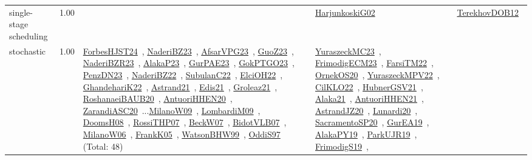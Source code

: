 {\begin{longtable}{p{3cm}r>{\raggedright\arraybackslash}p{6cm}>{\raggedright\arraybackslash}p{6cm}>{\raggedright\arraybackslash}p{8cm}}
\index{single-stage scheduling}\index{Concepts!single-stage scheduling}single-stage scheduling &  1.00 &  & \href{../works/HarjunkoskiG02.pdf}{HarjunkoskiG02}~\cite{HarjunkoskiG02} & \href{../works/TerekhovDOB12.pdf}{TerekhovDOB12}~\cite{TerekhovDOB12}\\
\index{stochastic}\index{Concepts!stochastic}stochastic &  1.00 & \href{../works/ForbesHJST24.pdf}{ForbesHJST24}~\cite{ForbesHJST24}, \href{../works/NaderiBZ23.pdf}{NaderiBZ23}~\cite{NaderiBZ23}, \href{../works/AfsarVPG23.pdf}{AfsarVPG23}~\cite{AfsarVPG23}, \href{../works/GuoZ23.pdf}{GuoZ23}~\cite{GuoZ23}, \href{../works/NaderiBZR23.pdf}{NaderiBZR23}~\cite{NaderiBZR23}, \href{../works/AlakaP23.pdf}{AlakaP23}~\cite{AlakaP23}, \href{../works/GurPAE23.pdf}{GurPAE23}~\cite{GurPAE23}, \href{../works/GokPTGO23.pdf}{GokPTGO23}~\cite{GokPTGO23}, \href{../works/PenzDN23.pdf}{PenzDN23}~\cite{PenzDN23}, \href{../works/NaderiBZ22.pdf}{NaderiBZ22}~\cite{NaderiBZ22}, \href{../works/SubulanC22.pdf}{SubulanC22}~\cite{SubulanC22}, \href{../works/ElciOH22.pdf}{ElciOH22}~\cite{ElciOH22}, \href{../works/GhandehariK22.pdf}{GhandehariK22}~\cite{GhandehariK22}, \href{../works/Astrand21.pdf}{Astrand21}~\cite{Astrand21}, \href{../works/Edis21.pdf}{Edis21}~\cite{Edis21}, \href{../works/Groleaz21.pdf}{Groleaz21}~\cite{Groleaz21}, \href{../works/RoshanaeiBAUB20.pdf}{RoshanaeiBAUB20}~\cite{RoshanaeiBAUB20}, \href{../works/AntuoriHHEN20.pdf}{AntuoriHHEN20}~\cite{AntuoriHHEN20}, \href{../works/ZarandiASC20.pdf}{ZarandiASC20}~\cite{ZarandiASC20}...\href{../works/MilanoW09.pdf}{MilanoW09}~\cite{MilanoW09}, \href{../works/LombardiM09.pdf}{LombardiM09}~\cite{LombardiM09}, \href{../works/DoomsH08.pdf}{DoomsH08}~\cite{DoomsH08}, \href{../works/RossiTHP07.pdf}{RossiTHP07}~\cite{RossiTHP07}, \href{../works/BeckW07.pdf}{BeckW07}~\cite{BeckW07}, \href{../works/BidotVLB07.pdf}{BidotVLB07}~\cite{BidotVLB07}, \href{../works/MilanoW06.pdf}{MilanoW06}~\cite{MilanoW06}, \href{../works/FrankK05.pdf}{FrankK05}~\cite{FrankK05}, \href{../works/WatsonBHW99.pdf}{WatsonBHW99}~\cite{WatsonBHW99}, \href{../works/OddiS97.pdf}{OddiS97}~\cite{OddiS97} (Total: 48) & \href{../works/YuraszeckMC23.pdf}{YuraszeckMC23}~\cite{YuraszeckMC23}, \href{../works/FrimodigECM23.pdf}{FrimodigECM23}~\cite{FrimodigECM23}, \href{../works/FarsiTM22.pdf}{FarsiTM22}~\cite{FarsiTM22}, \href{../works/OrnekOS20.pdf}{OrnekOS20}~\cite{OrnekOS20}, \href{../works/YuraszeckMPV22.pdf}{YuraszeckMPV22}~\cite{YuraszeckMPV22}, \href{../works/CilKLO22.pdf}{CilKLO22}~\cite{CilKLO22}, \href{../works/HubnerGSV21.pdf}{HubnerGSV21}~\cite{HubnerGSV21}, \href{../works/Alaka21.pdf}{Alaka21}~\cite{Alaka21}, \href{../works/AntuoriHHEN21.pdf}{AntuoriHHEN21}~\cite{AntuoriHHEN21}, \href{../works/AstrandJZ20.pdf}{AstrandJZ20}~\cite{AstrandJZ20}, \href{../works/Lunardi20.pdf}{Lunardi20}~\cite{Lunardi20}, \href{../works/SacramentoSP20.pdf}{SacramentoSP20}~\cite{SacramentoSP20}, \href{../works/GurEA19.pdf}{GurEA19}~\cite{GurEA19}, \href{../works/AlakaPY19.pdf}{AlakaPY19}~\cite{AlakaPY19}, \href{../works/ParkUJR19.pdf}{ParkUJR19}~\cite{ParkUJR19}, \href{../works/FrimodigS19.pdf}{FrimodigS19}~\cite{FrimodigS19}, 
\end{longtable}}
